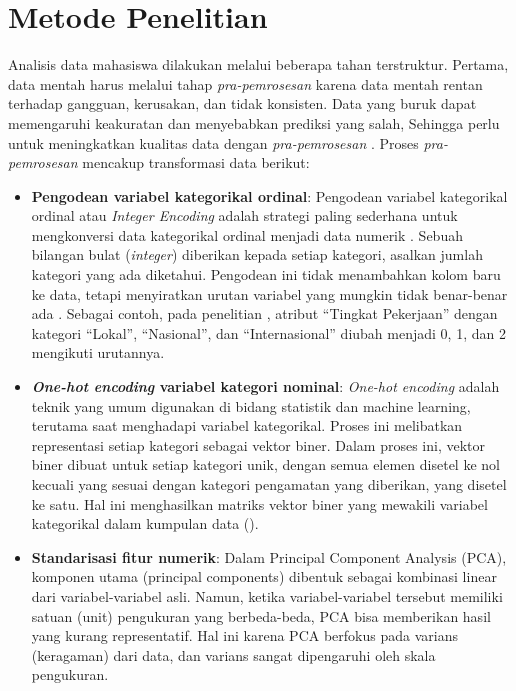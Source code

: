 \section{Metode Penelitian}
Analisis data mahasiswa dilakukan melalui beberapa tahan terstruktur. Pertama, data mentah harus melalui tahap \textit{pra-pemrosesan} karena data mentah rentan terhadap gangguan, kerusakan, dan tidak konsisten. Data yang buruk dapat memengaruhi keakuratan dan menyebabkan prediksi yang salah, Sehingga perlu untuk meningkatkan kualitas data dengan \textit{pra-pemrosesan} \textcite{Maharana2022}. Proses \textit{pra-pemrosesan} mencakup transformasi data berikut:

\begin{itemize}
	\item \textbf{Pengodean variabel kategorikal ordinal}: Pengodean variabel kategorikal ordinal atau \textit{Integer Encoding} adalah strategi paling sederhana untuk mengkonversi data kategorikal ordinal menjadi data numerik \textcite{Pargent2022}. Sebuah bilangan bulat (\textit{integer}) diberikan kepada setiap kategori, asalkan jumlah kategori yang ada diketahui. Pengodean ini tidak menambahkan kolom baru ke data, tetapi menyiratkan urutan variabel yang mungkin tidak benar-benar ada \textcite{Potdar2017}. Sebagai contoh, pada penelitian \textcite{Prasetyawan2025}, atribut “Tingkat Pekerjaan” dengan kategori “Lokal”, “Nasional”, dan “Internasional” diubah menjadi 0, 1, dan 2 mengikuti urutannya.
	\item \textbf{\textit{One-hot encoding} variabel kategori nominal}: \textit{One-hot encoding} adalah teknik yang umum digunakan di bidang statistik dan machine learning, terutama saat menghadapi variabel kategorikal. Proses ini melibatkan representasi setiap kategori sebagai vektor biner. Dalam proses ini, vektor biner dibuat untuk setiap kategori unik, dengan semua elemen disetel ke nol kecuali yang sesuai dengan kategori pengamatan yang diberikan, yang disetel ke satu. Hal ini menghasilkan matriks vektor biner yang mewakili variabel kategorikal dalam kumpulan data (\cite{JIS2024}).
	\item \textbf{Standarisasi fitur numerik}: Dalam Principal Component Analysis (PCA), komponen utama (principal components) dibentuk sebagai kombinasi linear dari variabel-variabel asli. Namun, ketika variabel-variabel tersebut memiliki satuan (unit) pengukuran yang berbeda-beda, PCA bisa memberikan hasil yang kurang representatif. Hal ini karena PCA berfokus pada varians (keragaman) dari data, dan varians sangat dipengaruhi oleh skala pengukuran\textcite{Jolliffe2016}.


\end{itemize}
